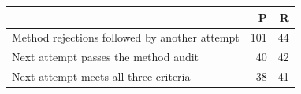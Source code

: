 \begin{tabular}{lrr}
\toprule
 & P & R \\
\midrule
Method rejections followed by another attempt & 101 & 44 \\
Next attempt passes the method audit & 40 & 42 \\
Next attempt meets all three criteria & 38 & 41 \\
\bottomrule
\end{tabular}
